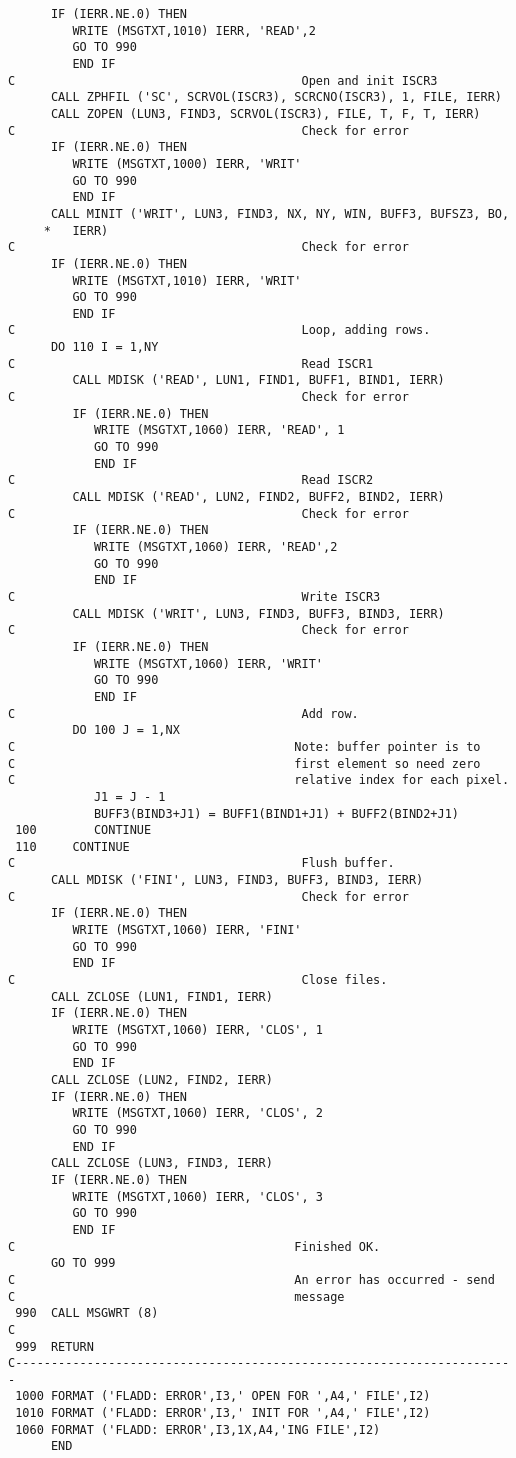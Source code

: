 \begin{verbatim}
      IF (IERR.NE.0) THEN
         WRITE (MSGTXT,1010) IERR, 'READ',2
         GO TO 990
         END IF
C                                        Open and init ISCR3
      CALL ZPHFIL ('SC', SCRVOL(ISCR3), SCRCNO(ISCR3), 1, FILE, IERR)
      CALL ZOPEN (LUN3, FIND3, SCRVOL(ISCR3), FILE, T, F, T, IERR)
C                                        Check for error
      IF (IERR.NE.0) THEN
         WRITE (MSGTXT,1000) IERR, 'WRIT'
         GO TO 990
         END IF
      CALL MINIT ('WRIT', LUN3, FIND3, NX, NY, WIN, BUFF3, BUFSZ3, BO,
     *   IERR)
C                                        Check for error
      IF (IERR.NE.0) THEN
         WRITE (MSGTXT,1010) IERR, 'WRIT'
         GO TO 990
         END IF
C                                        Loop, adding rows.
      DO 110 I = 1,NY
C                                        Read ISCR1
         CALL MDISK ('READ', LUN1, FIND1, BUFF1, BIND1, IERR)
C                                        Check for error
         IF (IERR.NE.0) THEN
            WRITE (MSGTXT,1060) IERR, 'READ', 1
            GO TO 990
            END IF
C                                        Read ISCR2
         CALL MDISK ('READ', LUN2, FIND2, BUFF2, BIND2, IERR)
C                                        Check for error
         IF (IERR.NE.0) THEN
            WRITE (MSGTXT,1060) IERR, 'READ',2
            GO TO 990
            END IF
C                                        Write ISCR3
         CALL MDISK ('WRIT', LUN3, FIND3, BUFF3, BIND3, IERR)
C                                        Check for error
         IF (IERR.NE.0) THEN
            WRITE (MSGTXT,1060) IERR, 'WRIT'
            GO TO 990
            END IF
C                                        Add row.
         DO 100 J = 1,NX
C                                       Note: buffer pointer is to
C                                       first element so need zero
C                                       relative index for each pixel.
            J1 = J - 1
            BUFF3(BIND3+J1) = BUFF1(BIND1+J1) + BUFF2(BIND2+J1)
 100        CONTINUE
 110     CONTINUE
C                                        Flush buffer.
      CALL MDISK ('FINI', LUN3, FIND3, BUFF3, BIND3, IERR)
C                                        Check for error
      IF (IERR.NE.0) THEN
         WRITE (MSGTXT,1060) IERR, 'FINI'
         GO TO 990
         END IF
C                                        Close files.
      CALL ZCLOSE (LUN1, FIND1, IERR)
      IF (IERR.NE.0) THEN
         WRITE (MSGTXT,1060) IERR, 'CLOS', 1
         GO TO 990
         END IF
      CALL ZCLOSE (LUN2, FIND2, IERR)
      IF (IERR.NE.0) THEN
         WRITE (MSGTXT,1060) IERR, 'CLOS', 2
         GO TO 990
         END IF
      CALL ZCLOSE (LUN3, FIND3, IERR)
      IF (IERR.NE.0) THEN
         WRITE (MSGTXT,1060) IERR, 'CLOS', 3
         GO TO 990
         END IF
C                                       Finished OK.
      GO TO 999
C                                       An error has occurred - send
C                                       message
 990  CALL MSGWRT (8)
C
 999  RETURN
C----------------------------------------------------------------------
 1000 FORMAT ('FLADD: ERROR',I3,' OPEN FOR ',A4,' FILE',I2)
 1010 FORMAT ('FLADD: ERROR',I3,' INIT FOR ',A4,' FILE',I2)
 1060 FORMAT ('FLADD: ERROR',I3,1X,A4,'ING FILE',I2)
      END



\end{verbatim}
